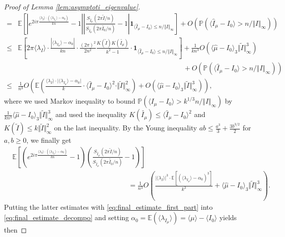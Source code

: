 \documentclass[10pt,11pt]{amsart}%
\begin{document}
\begin{proof}[Proof of Lemma \ref{lem:asymptoti_eigenvalue}]
\begin{align*}
=&\mathbb{E}\left[\left\vert e^{2i\pi \frac{\langle \lambda_I\rangle\cdot(\langle \lambda_{I_{\mu}}\rangle-\alpha_0)}{kn}}-1\right\vert\left\vert\frac{S_{\hat{I}_{\mu}}(2\pi \tilde{I}/n)}{S_{\hat{I}_{\mu}}(2\pi\tilde{I_0}/n)}-1\right\vert\mathbf{1}_{\langle  \hat{I}_{\mu}-I_0\rangle\leq n/\Vert I\Vert_{\infty}}\right]+O\left(\mathbb{P}(\langle  \hat{I}_{\mu}-I_0\rangle> n/\Vert I\Vert_{\infty})\right)\\
\leq& \mathbb{E}\left[ 2\pi \langle \lambda_I\rangle\cdot\frac{\left\vert\langle \lambda_{I_{\mu}}\rangle-\alpha_0\right\vert}{kn}\cdot\frac{(2\pi)^2}{2n^2}\frac{K(\tilde{I})K(\widetilde{I_{\mu}})}{k^2-1}\cdot\mathbf{1}_{\langle  \hat{I}_{\mu}-I_0\rangle\leq n/\Vert I\Vert_{\infty}}\right]+\frac{1}{kn^3}O\left(\langle\hat{\mu}-I_0\rangle_3\Vert \tilde{I}\Vert_\infty^3\right)\\
&\hspace{10cm}+O\left(\mathbb{P}(\langle  \hat{I}_{\mu}-I_0\rangle> n/\Vert I\Vert_{\infty})\right)\\
\leq & \frac{1}{n^3}O\left(\mathbb{E}\left(\frac{\langle \lambda_I\rangle \cdot\Big\vert\langle \lambda_{I_{\mu}}\rangle-\alpha_0\Big\vert}{k} \cdot\langle  \hat{I}_{\mu}-I_0\rangle^2\cdot\Vert \tilde{I}\Vert_{\infty}^2\right)+O\left(\langle\hat{\mu}-I_0\rangle_3\Vert \tilde{I}\Vert_\infty^3\right)\right),
\end{align*}
where we used Markov inequality to bound $\mathbb{P}(\langle  \hat{I}_{\mu}-I_0\rangle> k^{1/3}n/\Vert I\Vert_{\infty})$ by $\frac{1}{kn^3}\langle\hat{\mu}-I_0\rangle_3\Vert \tilde{I}\Vert_\infty^3$ and used the inequality $K(\tilde{I_{\mu}})\leq \langle  \hat{I}_{\mu}-I_0\rangle^2$ and $K(\tilde{I})\leq k\Vert\tilde{I}\Vert_{\infty}^2$ on the last inequality. By the Young inequality $ab\leq \frac{a^3}{3}+\frac{3b^{3/2}}{2}$ for $a,b\geq 0$, we finally get
\begin{align*}
&\mathbb{E}\left[\left(e^{2i\pi \frac{\langle \lambda_I\rangle\cdot(\langle \lambda_{I_{\mu}}\rangle-\alpha_0)}{kn}}-1\right)\left(\frac{S_{\hat{I}_{\mu}}(2\pi \tilde{I}/n)}{S_{\hat{I}_{\mu}}(2\pi\tilde{I_0}/n)}-1\right)\right]\\
&\hspace{7cm}=\frac{1}{n^3}O\left(\frac{\vert\langle \lambda_I\rangle\vert^3\cdot\mathbb{E}\left[\left(\langle \lambda_{I_{\mu}}\rangle-\alpha_0\right)^3\right]}{k^3}+\langle\hat{\mu}-I_0\rangle_3\Vert \tilde{I}\Vert_\infty^3\right).
\end{align*}
Putting the latter estimates with \eqref{eq:final_estimate_first_part} into \eqref{eq:final_estimate_decompo} and setting $\alpha_0=\mathbb{E}(\langle \lambda_{I_{\mu}}\rangle)=\langle\mu\rangle-\langle I_0\rangle$ yields then

\end{proof}
\end{document}
